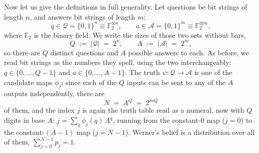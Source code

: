 \documentclass[11pt]{article}
\begin{document}
Now let us give the definitions in full generality. Let questions be bit
strings of length $n$, and answers bit strings of length $m$:
\begin{equation}
  q \in \mathcal Q = \{0,1\}^n \equiv \mathbb{F}_2^{\otimes n},
  \qquad
  a \in \mathcal A = \{0,1\}^m \equiv \mathbb{F}_2^{\otimes m},
\end{equation}
where $\mathbb{F}_2$ is the binary field. We write the sizes of those two sets without bars,
\begin{equation}
  Q \;:=\; |\mathcal Q| \;=\; 2^n,
  \qquad
  A \;:=\; |\mathcal A| \;=\; 2^m,
  \label{eq:sizes}
\end{equation}
so there are $Q$ distinct questions and $A$ possible answers to
each. As before, we read bit strings as the numbers they spell, using
the two interchangeably: $q \in \{0, \ldots, Q{-}1\}$ and
$a \in \{0, \ldots, A{-}1\}$. The truth
$\psi: \mathcal Q \to \mathcal A$ is one of
the candidate maps $\phi_j$; since each of the $Q$ inputs can be
sent to any of the $A$ outputs independently, there are
\begin{equation}
  N \;=\; A^{Q} \;=\; 2^{mQ}
\end{equation}
of them, and the index $j$ is again the truth table read as a
numeral, now with $Q$ digits in base $A$:
$j = \sum_q \phi_j(q)\,A^{q}$, running from the constant-$0$ map
($j = 0$) to the constant-$(A{-}1)$ map ($j = N{-}1$). Werner's
belief is a distribution over all of them, $\sum_{j=0}^{N-1} p_j = 1$.
\end{document}
